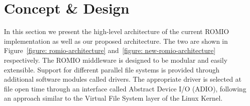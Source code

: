 \section{Concept \& Design}
\label{sec: concept}
In this section we present the high-level architecture of the current ROMIO implementation as well as our proposed architecture. The two are shown in Figure~\ref{figure: romio-architecture} and~\ref{figure: new-romio-architecture} respectively. The ROMIO middleware is designed to be modular and easily extensible. Support for different parallel file systems is provided through additional software modules called drivers. The appropriate driver is selected at file open time through an interface called Abstract Device I/O (ADIO), following an approach similar to the Virtual File System layer of the Linux Kernel. 

